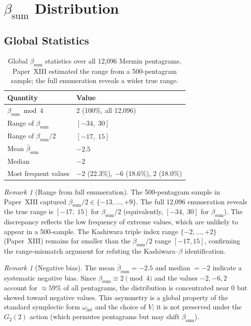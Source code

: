 \documentclass[11pt,a4paper]{article}
\theoremstyle{remark}
\newtheorem{remark}[theorem]{Remark}
\begin{document}
\section{\texorpdfstring{$\beta_{\mathrm{sum}}$ Distribution}{beta_sum Distribution}}\label{sec:betadist}

\subsection{Global Statistics}

\begin{table}[H]
\centering
\caption{Global $\beta_{\mathrm{sum}}$ statistics over all 12{,}096 Mermin
pentagrams.
Paper~XIII estimated the range from a 500-pentagram sample; the full
enumeration reveals a wider true range.}
\label{tab:betadist}
\begin{tabular}{ll}
\toprule
Quantity & Value \\
\midrule
$\beta_{\mathrm{sum}} \bmod 4$ & $2$ (100\%, all 12{,}096) \\
Range of $\beta_{\mathrm{sum}}$ & $[-34,\; 30]$ \\
Range of $\beta_{\mathrm{sum}}/2$ & $[-17,\; 15]$ \\
Mean $\bar{\beta}_{\mathrm{sum}}$ & $-2.5$ \\
Median & $-2$ \\
Most frequent values & $-2$ (22.3\%), $-6$ (18.6\%), $2$ (18.0\%) \\
\bottomrule
\end{tabular}
\end{table}

\begin{remark}[Range from full enumeration]
The 500-pentagram sample in Paper~XIII \cite{PaperXIII} captured
$\beta_{\mathrm{sum}}/2 \in \{-13,\ldots,+9\}$.
The full 12{,}096 enumeration reveals the true range is $[-17,\;15]$ for
$\beta_{\mathrm{sum}}/2$ (equivalently, $[-34,\;30]$ for $\beta_{\mathrm{sum}}$).
The discrepancy reflects the low frequency of extreme values, which are
unlikely to appear in a 500-sample.
The Kashiwara triple index range $\{-2,\ldots,+2\}$ (Paper~XIII) remains far
smaller than the $\beta_{\mathrm{sum}}/2$ range $[-17,15]$, confirming the
range-mismatch argument for refuting the Kashiwara--$\beta$ identification.
\end{remark}

\begin{remark}[Negative bias]
The mean $\bar{\beta}_{\mathrm{sum}} = -2.5$ and median $= -2$ indicate a
systematic negative bias.
Since $\beta_{\mathrm{sum}} \equiv 2\pmod 4$ and the values $-2, -6, 2$
account for $\approx 59\%$ of all pentagrams, the distribution is concentrated
near $0$ but skewed toward negative values.
This asymmetry is a global property of the standard symplectic form
$\omega_{\mathrm{int}}$ and the choice of $V$; it is not preserved under the
$G_2(2)$ action (which permutes pentagrams but may shift $\beta_{\mathrm{sum}}$).
\end{remark}
\end{document}
